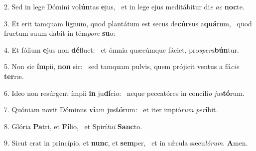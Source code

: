 2. Sed in lege Dómini vo\textbf{lún}tas \textbf{e}jus, \ast\  et in lege ejus meditábitur di\textit{e} \textit{ac} \textbf{noc}te.\

3. Et erit tamquam lignum, quod plantátum est secus de\textbf{cúr}sus a\textbf{quá}rum, \ast\  quod fructum suum dabit in tém\textit{po}\textit{re} \textbf{su}o:\

4. Et fólium \textbf{e}jus non \textbf{dé}fluet: \ast\  et ómnia quæcúmque fáciet, pro\textit{spe}\textit{ra}\textbf{bún}tur.\

5. Non sic \textbf{ím}pii, \textbf{non} sic: \ast\  sed tamquam pulvis, quem prójicit ventus a fá\textit{ci}\textit{e} \textbf{ter}ræ.\

6. Ideo non resúrgent ímpii \textbf{in} ju\textbf{dí}cio: \ast\  neque peccatóres in concíli\textit{o} \textit{jus}\textbf{tó}rum.\

7. Quóniam novit Dóminus \textbf{vi}am jus\textbf{tó}rum: \ast\  et iter impió\textit{rum} \textit{per}\textbf{í}bit.\

8. Glória \textbf{Pa}tri, et \textbf{Fí}lio, \ast\  et Spirí\textit{tu}\textit{i} \textbf{Sanc}to.\

9. Sicut erat in princípio, et \textbf{nunc}, et \textbf{sem}per, \ast\  et in sǽcula sæcu\textit{ló}\textit{rum}. \textbf{A}men.\

